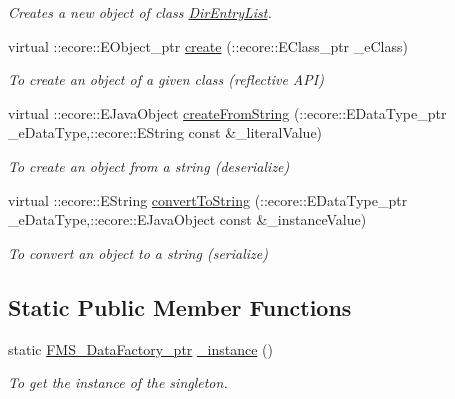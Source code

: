 \begin{DoxyCompactItemize}
\begin{DoxyCompactList}\small\item\em Creates a new object of class \hyperlink{classFMS__Data_1_1DirEntryList}{DirEntryList}. \item\end{DoxyCompactList}\item 
virtual ::ecore::EObject\_\-ptr \hyperlink{classFMS__Data_1_1FMS__DataFactory_a3d142b29cc6fc772e255f34bf7a16844}{create} (::ecore::EClass\_\-ptr \_\-eClass)
\begin{DoxyCompactList}\small\item\em To create an object of a given class (reflective API) \item\end{DoxyCompactList}\item 
virtual ::ecore::EJavaObject \hyperlink{classFMS__Data_1_1FMS__DataFactory_a93be53e29a391ba802d0e049c14c5724}{createFromString} (::ecore::EDataType\_\-ptr \_\-eDataType,::ecore::EString const \&\_\-literalValue)
\begin{DoxyCompactList}\small\item\em To create an object from a string (deserialize) \item\end{DoxyCompactList}\item 
virtual ::ecore::EString \hyperlink{classFMS__Data_1_1FMS__DataFactory_a0f3f0afbee76a3d3cf9a1b63ae4e415f}{convertToString} (::ecore::EDataType\_\-ptr \_\-eDataType,::ecore::EJavaObject const \&\_\-instanceValue)
\begin{DoxyCompactList}\small\item\em To convert an object to a string (serialize) \item\end{DoxyCompactList}\end{DoxyCompactItemize}
\subsection*{Static Public Member Functions}
\begin{DoxyCompactItemize}
\item 
static \hyperlink{classFMS__Data_1_1FMS__DataFactory}{FMS\_\-DataFactory\_\-ptr} \hyperlink{classFMS__Data_1_1FMS__DataFactory_a593b94aa3e7a686804d70bc2b49aca58}{\_\-instance} ()
\begin{DoxyCompactList}\small\item\em To get the instance of the singleton. \item\end{DoxyCompactList}\end{DoxyCompactItemize}
